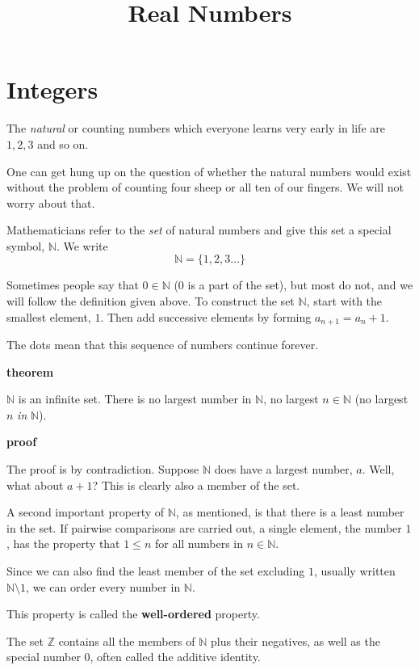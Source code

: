 \documentclass[11pt, oneside]{article}
\title{Real Numbers}
\date{}
\begin{document}
\maketitle
\Large
\section{Integers}

The \emph{natural} or counting numbers which everyone learns very early in life are $1, 2, 3$ and so on.

One can get hung up on the question of whether the natural numbers would exist without the problem of counting four sheep or all ten of our fingers.  We will not worry about that.

Mathematicians refer to the \emph{set} of natural numbers and give this set a special symbol, $\mathbb{N}$.  We write
\[ \mathbb{N} = \{ 1, 2, 3 \dots \} \]

Sometimes people say that $0 \in \mathbb{N}$ (0 is a part of the set), but most do not, and we will follow the definition given above.  To construct the set $\mathbb{N}$, start with the smallest element, $1$.  Then add successive elements by forming $a_{n+1} = a_n + 1$.

The dots mean that this sequence of numbers continue forever.  

\textbf{theorem}

$\mathbb{N}$ is an infinite set.  There is no largest number in $\mathbb{N}$, no largest $n \in \mathbb{N}$ (no largest $n$ \emph{in} $\mathbb{N}$).

\textbf{proof}

The proof is by contradiction.  Suppose $\mathbb{N}$ does have a largest number, $a$.  Well, what about $a + 1$?  This is clearly also a member of the set.

A second important property of $\mathbb{N}$, as mentioned, is that there is a least number in the set.  If pairwise comparisons are carried out, a single element, the number $1$, has the property that $1 \le n$ for all numbers in $n \in \mathbb{N}$.

Since we can also find the least member of the set excluding $1$, usually written $\mathbb{N} \setminus 1$, we can order every number in $\mathbb{N}$.  

This property is called the \textbf{well-ordered} property.

The set $\mathbb{Z}$ contains all the members of $\mathbb{N}$ plus their negatives, as well as the special number $0$, often called the additive identity.
\end{document}
